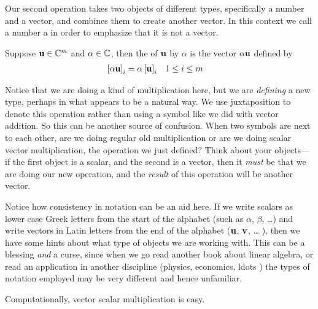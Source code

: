 \documentclass{ximera}
\begin{document}
Our second operation takes two objects of different types,
specifically a number and a vector, and combines them to create
another vector.  In this context we call a number a  in
order to emphasize that it is not a vector.

\begin{definition}
  Suppose $\mathbf{u}\in\mathbb{C}^{m}$ and $\alpha\in\mathbb{C}$, then the
   of $\mathbf{u}$ by $\alpha$ is the vector
  $\alpha\mathbf{u}$ defined by
  \begin{align*}
    \left\lbrack\alpha\mathbf{u}\right\rbrack_{i}
    &=\alpha\left\lbrack\mathbf{u}\right\rbrack_{i}
    &&1\leq i\leq m
  \end{align*}
\end{definition}

Notice that we are doing a kind of multiplication here, but we are
\textit{defining} a new type, perhaps in what appears to be a natural
way.  We use juxtaposition to denote this operation rather than using
a symbol like we did with vector addition.  So this can be another
source of confusion.  When two symbols are next to each other, are we
doing regular old multiplication or are we doing scalar vector
multiplication, the operation we just defined?  Think about your
objects---if the first object is a scalar, and the second is a vector,
then it \textit{must} be that we are doing our new operation, and the
\textit{result} of this operation will be another vector.

\begin{warning}
  Notice how consistency in notation can be an aid here.  If we write
  scalars as lower case Greek letters from the start of the alphabet
  (such as $\alpha$, $\beta$, \ldots ) and write vectors in Latin
  letters from the end of the alphabet ($\mathbf{u}$, $\mathbf{v}$, \ldots
  ), then we have some hints about what type of objects we are working
  with.  This can be a blessing \textit{and} a curse, since when we go
  read another book about linear algebra, or read an application in
  another discipline (physics, economics, ldots ) the types of
  notation employed may be very different and hence unfamiliar.
\end{warning}

Computationally, vector scalar multiplication is easy.
\end{document}
